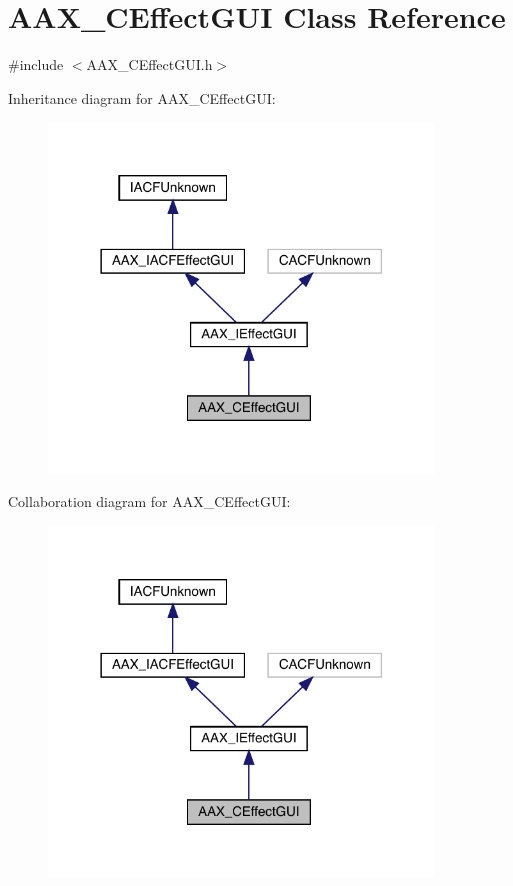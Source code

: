 \hypertarget{a01477}{}\section{A\+A\+X\+\_\+\+C\+Effect\+G\+UI Class Reference}
\label{a01477}


{\ttfamily \#include $<$A\+A\+X\+\_\+\+C\+Effect\+G\+U\+I.\+h$>$}



Inheritance diagram for A\+A\+X\+\_\+\+C\+Effect\+G\+UI\+:
\nopagebreak
\begin{figure}[H]
\begin{center}
\leavevmode
\includegraphics[width=290pt]{a01476}
\end{center}
\end{figure}


Collaboration diagram for A\+A\+X\+\_\+\+C\+Effect\+G\+UI\+:
\nopagebreak
\begin{figure}[H]
\begin{center}
\leavevmode
\includegraphics[width=290pt]{a01475}
\end{center}
\end{figure}


